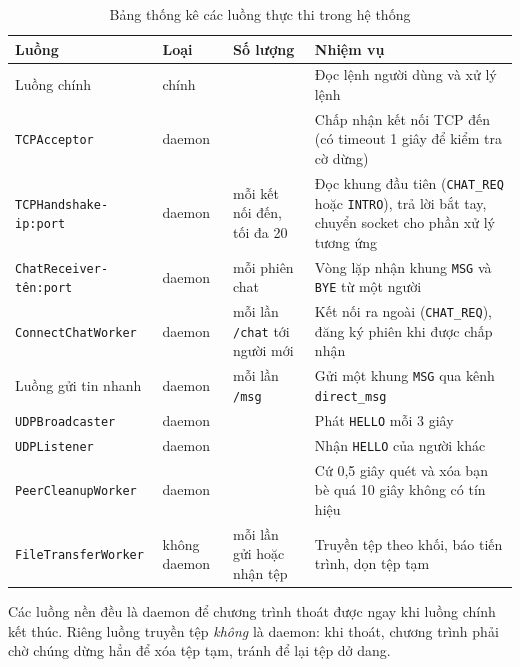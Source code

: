 \documentclass[a4paper,12pt]{article}
\newcommand{\code}[1]{\texttt{#1}}
\begin{document}
	\begin{table}[H]
		\centering
		\small
		\renewcommand{\arraystretch}{1.35}
		\begin{tabularx}{\textwidth}{|>{\raggedright\arraybackslash}p{4.3cm}|>{\centering\arraybackslash}p{1.8cm}|>{\raggedright\arraybackslash}p{2.4cm}|X|}
			\hline
			\rowcolor{blue!12}
			\textcolor{blue!80!black}{\textbf{Luồng}} & \textcolor{blue!80!black}{\textbf{Loại}} & \textcolor{blue!80!black}{\textbf{Số lượng}} & \textcolor{blue!80!black}{\textbf{Nhiệm vụ}} \\
			\hline
			Luồng chính & chính & 1 & Đọc lệnh người dùng và xử lý lệnh \\
			\hline
			\code{TCPAcceptor} & daemon & 1 & Chấp nhận kết nối TCP đến (có timeout 1 giây để kiểm tra cờ dừng) \\
			\hline
			\code{TCPHandshake-ip:port} & daemon & mỗi kết nối đến, tối đa 20 & Đọc khung đầu tiên (\code{CHAT\_REQ} hoặc \code{INTRO}), trả lời bắt tay, chuyển socket cho phần xử lý tương ứng \\
			\hline
			\code{ChatReceiver-tên:port} & daemon & mỗi phiên chat & Vòng lặp nhận khung \code{MSG} và \code{BYE} từ một người \\
			\hline
			\code{ConnectChatWorker} & daemon & mỗi lần \code{/chat} tới người mới & Kết nối ra ngoài (\code{CHAT\_REQ}), đăng ký phiên khi được chấp nhận \\
			\hline
			Luồng gửi tin nhanh & daemon & mỗi lần \code{/msg} & Gửi một khung \code{MSG} qua kênh \code{direct\_msg} \\
			\hline
			\code{UDPBroadcaster} & daemon & 1 & Phát \code{HELLO} mỗi 3 giây \\
			\hline
			\code{UDPListener} & daemon & 1 & Nhận \code{HELLO} của người khác \\
			\hline
			\code{PeerCleanupWorker} & daemon & 1 & Cứ 0,5 giây quét và xóa bạn bè quá 10 giây không có tín hiệu \\
			\hline
			\code{FileTransferWorker} & không daemon & mỗi lần gửi hoặc nhận tệp & Truyền tệp theo khối, báo tiến trình, dọn tệp tạm \\
			\hline
		\end{tabularx}
		\caption{Bảng thống kê các luồng thực thi trong hệ thống}
		\label{tab:thread_summary}
	\end{table}
	
	Các luồng nền đều là daemon để chương trình thoát được ngay khi luồng chính kết thúc. Riêng luồng truyền tệp \emph{không} là daemon: khi thoát, chương trình phải chờ chúng dừng hẳn để xóa tệp tạm, tránh để lại tệp dở dang.
	
\end{document}
